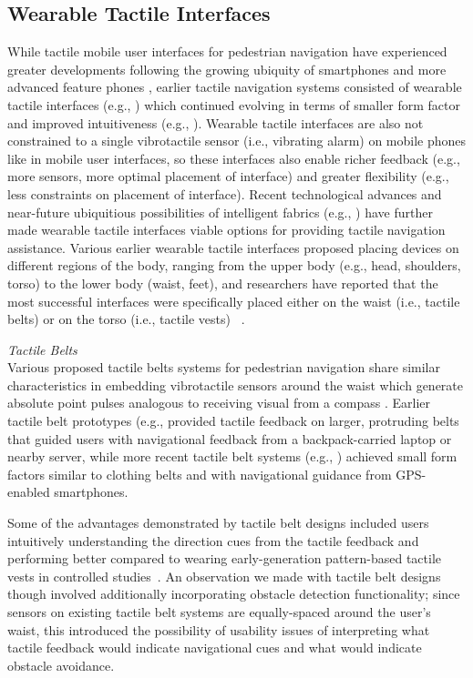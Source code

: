 \documentclass{sigchi}
\begin{document}
\subsection{Wearable Tactile Interfaces}
While tactile mobile user interfaces for pedestrian navigation have experienced greater developments following the growing ubiquity of smartphones and more advanced feature phones \cite{2012_Pielot_CHI}, earlier tactile navigation systems consisted of wearable tactile interfaces (e.g., \cite{2000_Ross_ASSETS, 2004_Tsukada_Ubicomp}) which continued evolving in terms of smaller form factor and improved intuitiveness (e.g., \cite{2011_Elliott_HI, 2010_Pielot_Pervasive}).  Wearable tactile interfaces are also not constrained to a single vibrotactile sensor (i.e., vibrating alarm) on mobile phones like in mobile user interfaces, so these interfaces also enable richer feedback (e.g., more sensors, more optimal placement of interface) and greater flexibility (e.g., less constraints on placement of interface).  Recent technological advances and near-future ubiquitious possibilities of intelligent fabrics (e.g., \cite{2008_Buechley_CHI}) have further made wearable tactile interfaces viable options for providing tactile navigation assistance. Various earlier wearable tactile interfaces proposed placing devices on different regions of the body, ranging from the upper body (e.g., head, shoulders, torso) to the lower body (waist, feet), and researchers have reported that the most successful interfaces were specifically placed either on the waist (i.e., tactile belts) or on the torso (i.e., tactile vests) ~\cite{2010_Srikulwong_HAID}.

\textit{Tactile Belts}\\
Various proposed tactile belts systems for pedestrian navigation share similar characteristics in embedding vibrotactile sensors around the waist which generate absolute point pulses analogous to receiving visual from a compass \cite{2010_Srikulwong_HAID}.  Earlier tactile belt prototypes (e.g., \cite{2004_VanVeen_EuroHaptics, 2005_VanErp_TAP, 2006_Johnson_EMBS, 2005_Nagel_JNeuralEng, 2004_Tsukada_Ubicomp} provided tactile feedback on larger, protruding belts that guided users with navigational feedback from a backpack-carried laptop or nearby server, while more recent tactile belt systems (e.g., \cite{2010_Pielot_Pervasive, 2009_Pielot_MobileHCI}) achieved small form factors similar to clothing belts and with navigational guidance from GPS-enabled smartphones.

Some of the advantages demonstrated by tactile belt designs included users intuitively understanding the direction cues from the tactile feedback \cite{2005_VanErp_TAP} and performing better compared to wearing early-generation pattern-based tactile vests in controlled studies~\cite{2010_Srikulwong_HAID}.  An observation we made with tactile belt designs though involved additionally incorporating obstacle detection functionality; since sensors on existing tactile belt systems are equally-spaced around the user's waist, this introduced the possibility of usability issues of interpreting what tactile feedback would indicate navigational cues and what would indicate obstacle avoidance.
\end{document}
